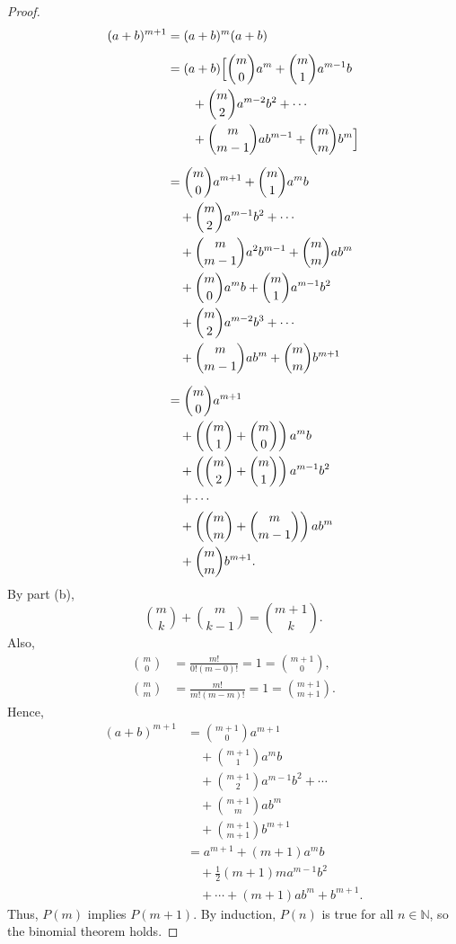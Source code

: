 \documentclass[11pt]{article}
\begin{document}
\begin{proof}
\begin{align*}
(a+b)^{m+1}
&=(a+b)^m(a+b)\\[4pt]
&=(a+b)\Bigl[
   \binom{m}{0}a^m+\binom{m}{1}a^{m-1}b\\
&\qquad+\binom{m}{2}a^{m-2}b^2+\cdots\\
&\qquad+\binom{m}{m-1}ab^{m-1}+\binom{m}{m}b^m
   \Bigr]\\[6pt]
&=\binom{m}{0}a^{m+1}+\binom{m}{1}a^mb\\
&\quad+\binom{m}{2}a^{m-1}b^2+\cdots\\
&\quad+\binom{m}{m-1}a^2b^{m-1}+\binom{m}{m}ab^m\\
&\quad+\binom{m}{0}a^mb+\binom{m}{1}a^{m-1}b^2\\
&\quad+\binom{m}{2}a^{m-2}b^3+\cdots\\
&\quad+\binom{m}{m-1}ab^m+\binom{m}{m}b^{m+1}\\[6pt]
&=\binom{m}{0}a^{m+1}\\
&\quad+\left(\binom{m}{1}+\binom{m}{0}\right)a^mb\\
&\quad+\left(\binom{m}{2}+\binom{m}{1}\right)a^{m-1}b^2\\
&\quad+\cdots\\
&\quad+\left(\binom{m}{m}+\binom{m}{m-1}\right)ab^m\\
&\quad+\binom{m}{m}b^{m+1}.
\end{align*}
By part (b),
\[
\binom{m}{k}+\binom{m}{k-1}=\binom{m+1}{k}.
\]
Also,
\begin{align*}
\binom{m}{0}
&=\frac{m!}{0!(m-0)!}=1=\binom{m+1}{0},\\[6pt]
\binom{m}{m}
&=\frac{m!}{m!(m-m)!}=1=\binom{m+1}{m+1}.
\end{align*}
Hence,
\begin{align*}
(a+b)^{m+1}
&=\binom{m+1}{0}a^{m+1}\\
&\quad+\binom{m+1}{1}a^mb\\
&\quad+\binom{m+1}{2}a^{m-1}b^2+\cdots\\
&\quad+\binom{m+1}{m}ab^m\\
&\quad+\binom{m+1}{m+1}b^{m+1}\\[6pt]
&=a^{m+1}+(m+1)a^mb\\
&\quad+\frac12(m+1)m a^{m-1}b^2\\
&\quad+\cdots+(m+1)ab^m+b^{m+1}.
\end{align*}
Thus, \(P(m)\) implies \(P(m+1)\).
By induction, \(P(n)\) is true for all \(n\in\mathbb{N}\), so the binomial theorem holds.
\end{proof}
\end{document}
